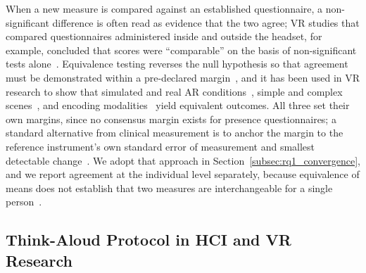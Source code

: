 


When a new measure is compared against an established questionnaire, a non-significant difference is often read as evidence that the two agree; VR studies that compared questionnaires administered inside and outside the headset, for example, concluded that scores were ``comparable'' on the basis of non-significant tests alone~\cite{schwind2019presence,regal2019questionnaires}. Equivalence testing reverses the null hypothesis so that agreement must be demonstrated within a pre-declared margin~\cite{lakens2017equivalence,lakens2018tutorial}, and it has been used in VR research to show that simulated and real AR conditions~\cite{lee2012equivalence}, simple and complex scenes~\cite{sanaei2024scene}, and encoding modalities~\cite{johnsdorf2025memory} yield equivalent outcomes. All three set their own margins, since no consensus margin exists for presence questionnaires; a standard alternative from clinical measurement is to anchor the margin to the reference instrument's own standard error of measurement and smallest detectable change~\cite{bland1986statistical}. We adopt that approach in Section~\ref{subsec:rq1_convergence}, and we report agreement at the individual level separately, because equivalence of means does not establish that two measures are interchangeable for a single person~\cite{lin1989concordance}.




\subsection{Think-Aloud Protocol in HCI and VR Research}


